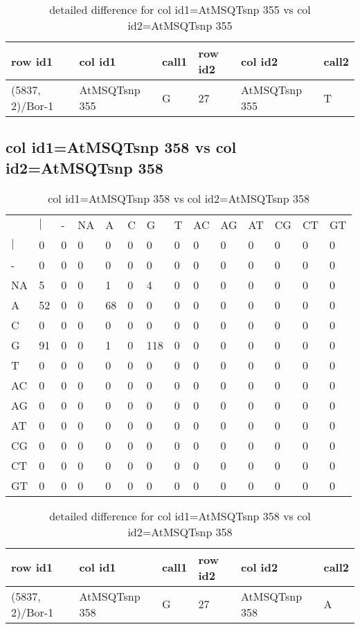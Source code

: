 \begin{center}
\begin{longtable}{|l|l|l|l|l|l|}
\caption{detailed difference for col id1=AtMSQTsnp 355 vs col id2=AtMSQTsnp 355} \label{table_dm871}\\
\hline
row id1&col id1&call1&row id2&col id2&call2\\
\hline
(5837, 2)/Bor-1&AtMSQTsnp 355&G&27&AtMSQTsnp 355&T\\
\hline
\end{longtable}
\end{center}

\subsection{col id1=AtMSQTsnp 358 vs col id2=AtMSQTsnp 358}
\begin{center}
\begin{longtable}{|l|l|l|l|l|l|l|l|l|l|l|l|l|l|}
\caption{col id1=AtMSQTsnp 358 vs col id2=AtMSQTsnp 358} \label{table_dm872}\\
\hline
\\
\hline
&$|$&-&NA&A&C&G&T&AC&AG&AT&CG&CT&GT\\
$|$&0&0&0&0&0&0&0&0&0&0&0&0&0\\
-&0&0&0&0&0&0&0&0&0&0&0&0&0\\
NA&5&0&0&1&0&4&0&0&0&0&0&0&0\\
A&52&0&0&68&0&0&0&0&0&0&0&0&0\\
C&0&0&0&0&0&0&0&0&0&0&0&0&0\\
G&91&0&0&1&0&118&0&0&0&0&0&0&0\\
T&0&0&0&0&0&0&0&0&0&0&0&0&0\\
AC&0&0&0&0&0&0&0&0&0&0&0&0&0\\
AG&0&0&0&0&0&0&0&0&0&0&0&0&0\\
AT&0&0&0&0&0&0&0&0&0&0&0&0&0\\
CG&0&0&0&0&0&0&0&0&0&0&0&0&0\\
CT&0&0&0&0&0&0&0&0&0&0&0&0&0\\
GT&0&0&0&0&0&0&0&0&0&0&0&0&0\\
\hline
\end{longtable}
\end{center}

\begin{center}
\begin{longtable}{|l|l|l|l|l|l|}
\caption{detailed difference for col id1=AtMSQTsnp 358 vs col id2=AtMSQTsnp 358} \label{table_dm873}\\
\hline
row id1&col id1&call1&row id2&col id2&call2\\
\hline
(5837, 2)/Bor-1&AtMSQTsnp 358&G&27&AtMSQTsnp 358&A\\
\hline
\end{longtable}
\end{center}

